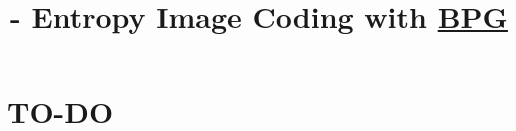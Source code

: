 

\title{\SM{} - Entropy Image Coding with \href{https://en.wikipedia.org/wiki/Better_Portable_Graphics}{BPG}}

\maketitle
\tableofcontents

\section{TO-DO}
